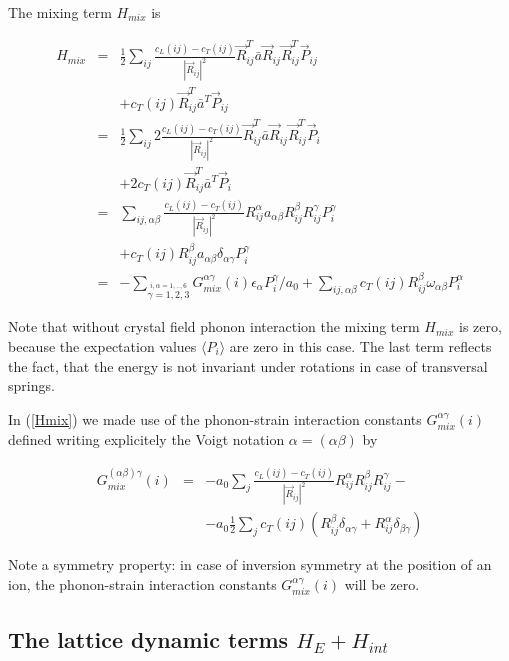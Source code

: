 The mixing term $H_{mix}$ is 

\begin{eqnarray}\label{Hmix}
H_{mix}&=&\frac{1}{2} \sum_{ij} \frac{c_L(ij)-c_T(ij)}{|\vec R_{ij}|^2} 
\vec R_{ij}^T\bar a \vec R_{ij}\vec R_{ij}^T \vec P_{ij}  \nonumber \\
      && + c_T(ij) \vec  R_{ij}^T\bar a^T\vec P_{ij} \nonumber \\
&=& \frac{1}{2}\sum_{ij} 2\frac{c_L(ij)-c_T(ij)}{|\vec R_{ij}|^2} 
\vec R_{ij}^T\bar a \vec R_{ij}\vec R_{ij}^T \vec P_{i}  \nonumber \\
      && + 2 c_T(ij) \vec  R_{ij}^T\bar a^T\vec P_{i} \nonumber \\
&=& \sum_{ij,\alpha\beta} \frac{c_L(ij)-c_T(ij)}{|\vec R_{ij}|^2} 
R_{ij}^{\alpha} a_{\alpha\beta} R_{ij}^{\beta} R_{ij}^{\gamma}  P_{i}^{\gamma}  \nonumber \\
      && +  c_T(ij)   R_{ij}^{\beta} a_{\alpha\beta} \delta_{\alpha\gamma} P_{i}^{\gamma}  \\
&=&-\sum_{\stackrel{i,\alpha=1,..,6}{ \gamma=1,2,3}} G_{mix}^{\alpha\gamma}(i) \epsilon_{\alpha} P_{i}^{\gamma}/a_0 +
 \sum_{ij,\alpha\beta}  c_T(ij)   R_{ij}^{\beta} \omega_{\alpha\beta} P_{i}^{\alpha} \nonumber
\end{eqnarray}

Note that without crystal field phonon interaction the mixing term $H_{mix}$ is zero, because
the expectation values $\langle P_i \rangle$ are zero in this case. The last term reflects
the fact, that the energy is not invariant under rotations in case of transversal springs.

In (\ref{Hmix}) we made use of the phonon-strain interaction constants $G_{mix}^{\alpha\gamma}(i)$
defined writing explicitely the Voigt notation $\alpha=(\alpha\beta)$ by

\begin{eqnarray}\label{Gmix}
G_{mix}^{(\alpha\beta)\gamma}(i)&=&
-a_0\sum_{j} \frac{c_L(ij)-c_T(ij)}{|\vec R_{ij}|^2} 
R_{ij}^{\alpha} R_{ij}^{\beta} R_{ij}^{\gamma} -   \nonumber \\
      && -a_0\frac{1}{2}\sum_{j}  c_T(ij)   (R_{ij}^{\beta}  \delta_{\alpha\gamma}+
R_{ij}^{\alpha}  \delta_{\beta\gamma}) 
\end{eqnarray}

Note a symmetry property: 
 in case of inversion symmetry at the position of an ion, the 
phonon-strain interaction constants $G_{mix}^{\alpha\gamma}(i)$ will be zero.

\subsection{The lattice dynamic terms $H_{E}+H_{int}$}

